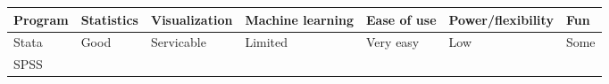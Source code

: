 \documentclass[]{book}
\begin{document}
\begin{longtable}[]{@{}lllllll@{}}
\toprule
\begin{minipage}[b]{0.08\columnwidth}\raggedright\strut
Program\strut
\end{minipage} & \begin{minipage}[b]{0.11\columnwidth}\raggedright\strut
Statistics\strut
\end{minipage} & \begin{minipage}[b]{0.13\columnwidth}\raggedright\strut
Visualization\strut
\end{minipage} & \begin{minipage}[b]{0.16\columnwidth}\raggedright\strut
Machine learning\strut
\end{minipage} & \begin{minipage}[b]{0.11\columnwidth}\raggedright\strut
Ease of use\strut
\end{minipage} & \begin{minipage}[b]{0.17\columnwidth}\raggedright\strut
Power/flexibility\strut
\end{minipage} & \begin{minipage}[b]{0.05\columnwidth}\raggedright\strut
Fun\strut
\end{minipage}\tabularnewline
\midrule
\endhead
\begin{minipage}[t]{0.08\columnwidth}\raggedright\strut
Stata\strut
\end{minipage} & \begin{minipage}[t]{0.11\columnwidth}\raggedright\strut
Good\strut
\end{minipage} & \begin{minipage}[t]{0.13\columnwidth}\raggedright\strut
Servicable\strut
\end{minipage} & \begin{minipage}[t]{0.16\columnwidth}\raggedright\strut
Limited\strut
\end{minipage} & \begin{minipage}[t]{0.11\columnwidth}\raggedright\strut
Very easy\strut
\end{minipage} & \begin{minipage}[t]{0.17\columnwidth}\raggedright\strut
Low\strut
\end{minipage} & \begin{minipage}[t]{0.05\columnwidth}\raggedright\strut
Some\strut
\end{minipage}\tabularnewline
\begin{minipage}[t]{0.08\columnwidth}\raggedright\strut
SPSS\strut
\end{minipage} & \begin{minipage}[t]{0.11\columnwidth}\raggedright\strut

\end{minipage}
\end{longtable}
\end{document}
